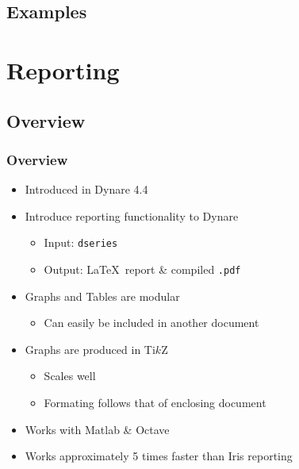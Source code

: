 \documentclass[10pt]{beamer}
\begin{document}
\subsection{Examples}


%
%
\section{Reporting}
\subsection{Overview}
\begin{frame}
  \frametitle{Overview}
  \begin{itemize}
  \item Introduced in Dynare 4.4
  \item Introduce reporting functionality to Dynare
      \begin{itemize}
      \item Input: \texttt{dseries}
      \item Output: \LaTeX\ report \& compiled \texttt{.pdf}
      \end{itemize}
    \item Graphs and Tables are modular
      \begin{itemize}
      \item Can easily be included in another document
      \end{itemize}
    \item Graphs are produced in Ti$k$Z
      \begin{itemize}
      \item Scales well
      \item Formating follows that of enclosing document
      \end{itemize}
    \item Works with Matlab \& Octave
    \item Works approximately 5 times faster than Iris reporting
  \end{itemize}
\end{frame}
\end{document}
